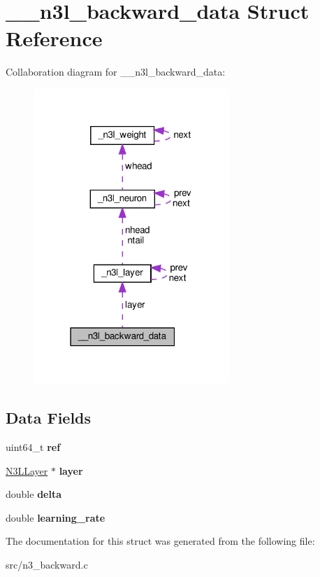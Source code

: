 \hypertarget{struct____n3l__backward__data}{}\section{\+\_\+\+\_\+n3l\+\_\+backward\+\_\+data Struct Reference}
\label{struct____n3l__backward__data}


Collaboration diagram for \+\_\+\+\_\+n3l\+\_\+backward\+\_\+data\+:\nopagebreak
\begin{figure}[H]
\begin{center}
\leavevmode
\includegraphics[width=210pt]{struct____n3l__backward__data__coll__graph}
\end{center}
\end{figure}
\subsection*{Data Fields}
\begin{DoxyCompactItemize}
\item 
\mbox{\label{struct____n3l__backward__data_a32ef8a9b7e79121a563b8cd5486f88d3}} 
uint64\+\_\+t {\bfseries ref}
\item 
\mbox{\label{struct____n3l__backward__data_a0dcc17f32256df3e7ec65046236ffd24}} 
\hyperlink{struct__n3l__layer}{N3\+L\+Layer} $\ast$ {\bfseries layer}
\item 
\mbox{\label{struct____n3l__backward__data_ab41bb2c143496d239fe41b208809cc85}} 
double {\bfseries delta}
\item 
\mbox{\label{struct____n3l__backward__data_aa29c1bf7dcb85bfaaa0ec9b01cecc425}} 
double {\bfseries learning\+\_\+rate}
\end{DoxyCompactItemize}


The documentation for this struct was generated from the following file\+:\begin{DoxyCompactItemize}
\item 
src/n3\+\_\+backward.\+c\end{DoxyCompactItemize}
